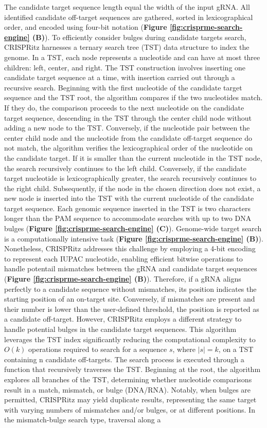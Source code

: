 \documentclass[a4paper, titlepage, openright]{book}
\begin{document}
The candidate target sequence length equal the width of the input gRNA. All identified candidate off-target sequences are gathered, sorted in lexicographical order, and encoded using four-bit notation (\textbf{Figure \ref{fig:crisprme-search-engine} (B)}). To efficiently consider bulges during candidate targets search, CRISPRitz harnesses a ternary search tree (TST) data structure \citep{bentley1998ternary} to index the genome. In a TST, each node represents a nucleotide and can have at most three children: left, center, and right. The TST construction involves inserting one candidate target sequence at a time, with insertion carried out through a recursive search. Beginning with the first nucleotide of the candidate target sequence and the TST root, the algorithm compares if the two nucleotides match. If they do, the comparison proceeds to the next nucleotide on the candidate target sequence, descending in the TST through the center child node without adding a new node to the TST. Conversely, if the nucleotide pair between the center child node and the nucleotide from the candidate off-target sequence do not match, the algorithm verifies the lexicographical order of the nucleotide on the candidate target. If it is smaller than the current nucleotide in the TST node, the search recursively continues to the left child. Conversely, if the candidate target nucleotide is lexicographically greater, the search recursively continues to the right child. Subsequently, if the node in the chosen direction does not exist, a new node is inserted into the TST with the current nucleotide of the candidate target sequence. Each genomic sequence inserted in the TST is two characters longer than the PAM sequence to accommodate searches with up to two DNA bulges (\textbf{Figure \ref{fig:crisprme-search-engine} (C)}). Genome-wide target search is a computationally intensive task (\textbf{Figure \ref{fig:crisprme-search-engine} (B)}). Nonetheless, CRISPRitz addresses this challenge by employing a 4-bit encoding to represent each IUPAC nucleotide, enabling efficient bitwise operations to handle potentail mismatches between the gRNA and candidate target sequences (\textbf{Figure \ref{fig:crisprme-search-engine} (B)}). Therefore, if a gRNA aligns perfectly to a candidate sequence without mismatches, its position indicates the starting position of an on-target site. Conversely, if mismatches are present and their number is lower than the user-defined threshold, the position is reported as a candidate off-target. However, CRISPRitz employs a different strategy to handle potential bulges in the candidate target sequences. This algorithm leverages the TST index significantly reducing the computational complexity to $O(k)$ operations required to search for a sequence $s$, where $|s|=k$, on a TST containing n candidate off-targets. The search process is executed through a function that recursively traverses the TST. Beginning at the root, the algorithm explores all branches of the TST, determining whether nucleotide comparisons result in a match, mismatch, or bulge (DNA/RNA). Notably, when bulges are permitted, CRISPRitz may yield duplicate results, representing the same target with varying numbers of mismatches and/or bulges, or at different positions. In the mismatch-bulge search type, traversal along a 
\end{document}
